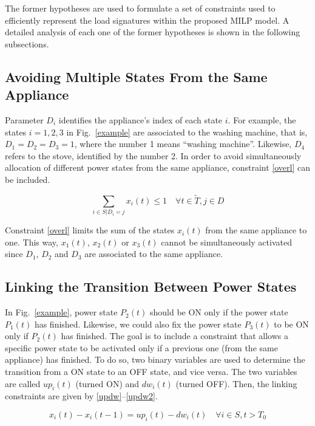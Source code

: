 The former hypotheses are used to formulate a set of constraints used to efficiently represent the load signatures within the proposed MILP model. A detailed analysis of each one of the former hypotheses is shown in the following subsections.

\subsection{Avoiding Multiple States From the Same Appliance}

Parameter $D_i$ identifies the appliance's index of each state $i$. For example, the states $i = 1, 2, 3$ in Fig.~\ref{example} are associated to the washing machine, that is, $D_1 = D_2 = D_3 = 1$, where the number 1 means ``washing machine''. Likewise, $D_4$ refers to the stove, identified by the number 2. In order to avoid simultaneously allocation of different power states from the same appliance, constraint \eqref{overl} can be included.

\begin{equation} \label{overl}
   \sum_{i \in S | D_{i} = j} x_i(t) \leq 1 \quad \forall t \in \tilde{T}, j \in D
\end{equation}

Constraint \eqref{overl} limits the sum of the states $x_i(t)$ from the same appliance to one. This way, $x_1(t)$, $x_2(t)$ or $x_3(t)$ cannot be simultaneously activated since $D_1$, $D_2$ and $D_3$ are associated to the same appliance.

\subsection{Linking the Transition Between Power States}

In Fig.~\ref{example}, power state $P_2(t)$ should be ON only if the power state $P_1(t)$ has finished. Likewise, we could also fix the power state $P_3(t)$ to be ON only if $P_2(t)$ has finished. The goal is to include a constraint that allows a specific power state to be activated only if a previous one (from the same appliance) has finished. To do so, two binary variables are used to determine the transition from a ON state to an OFF state, and vice versa. The two variables are called $up_i(t)$ (turned ON) and $dw_i(t)$ (turned OFF). Then, the linking constraints are given by \eqref{updw}--\eqref{updw2}.
%

\begin{equation} \label{updw}
    x_i(t) - x_i(t-1) = up_i(t) - dw_i(t) \quad \forall i \in S, t > T_0
\end{equation}


